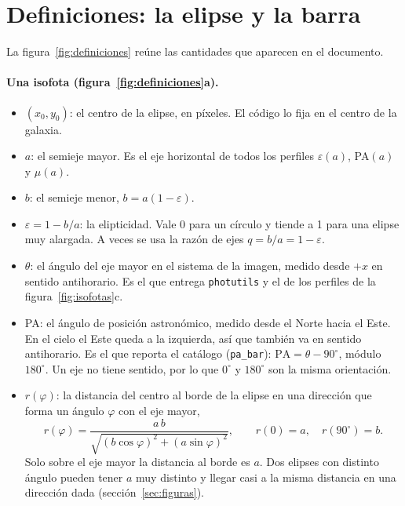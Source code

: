 \documentclass[11pt,a4paper]{article}
\newcommand{\code}[1]{\texttt{#1}}
\begin{document}
\section{Definiciones: la elipse y la barra}\label{app:definiciones}

La figura~\ref{fig:definiciones} reúne las cantidades que aparecen en el documento.

\paragraph{Una isofota (figura~\ref{fig:definiciones}a).}
\begin{itemize}
\item $(x_0, y_0)$: el centro de la elipse, en píxeles. El código lo fija en el centro de la galaxia.
\item $a$: el semieje mayor. Es el eje horizontal de todos los perfiles $\varepsilon(a)$, PA$(a)$ y $\mu(a)$.
\item $b$: el semieje menor, $b = a(1-\varepsilon)$.
\item $\varepsilon = 1 - b/a$: la elipticidad. Vale 0 para un círculo y tiende a 1 para una elipse muy alargada. A
veces se usa la razón de ejes $q = b/a = 1 - \varepsilon$.
\item $\theta$: el ángulo del eje mayor en el sistema de la imagen, medido desde $+x$ en sentido antihorario. Es el
que entrega \code{photutils} y el de los perfiles de la figura~\ref{fig:isofotas}c.
\item PA: el ángulo de posición astronómico, medido desde el Norte hacia el Este. En el cielo el Este queda a la
izquierda, así que también va en sentido antihorario. Es el que reporta el catálogo (\code{pa\_bar}):
$\mathrm{PA} = \theta - 90^\circ$, módulo $180^\circ$. Un eje no tiene sentido, por lo que $0^\circ$ y
$180^\circ$ son la misma orientación.
\item $r(\varphi)$: la distancia del centro al borde de la elipse en una dirección que forma un ángulo $\varphi$
con el eje mayor,
\begin{equation}
r(\varphi) = \frac{a\,b}{\sqrt{(b\cos\varphi)^2 + (a\sin\varphi)^2}}, \qquad r(0) = a, \quad r(90^\circ) = b .
\end{equation}
Solo sobre el eje mayor la distancia al borde es $a$. Dos elipses con distinto ángulo pueden tener $a$ muy distinto
y llegar casi a la misma distancia en una dirección dada (sección~\ref{sec:figuras}).
\end{itemize}
\end{document}
